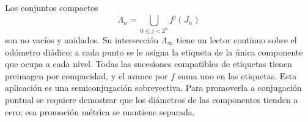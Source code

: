 Los conjuntos compactos
\[
\Lambda_n=\bigcup_{0\le j<2^n}f^j(J_n)
\]
son no vacíos y anidados. Su intersección \(\Lambda_\infty\) tiene un lector continuo sobre el odómetro diádico: a cada punto se le asigna la etiqueta de la única componente que ocupa a cada nivel. Todas las sucesiones compatibles de etiquetas tienen preimagen por compacidad, y el avance por \(f\) suma uno en las etiquetas. Esta aplicación es una semiconjugación sobreyectiva. Para promoverla a conjugación puntual se requiere demostrar que los diámetros de las componentes tienden a cero; esa promoción métrica se mantiene separada.
